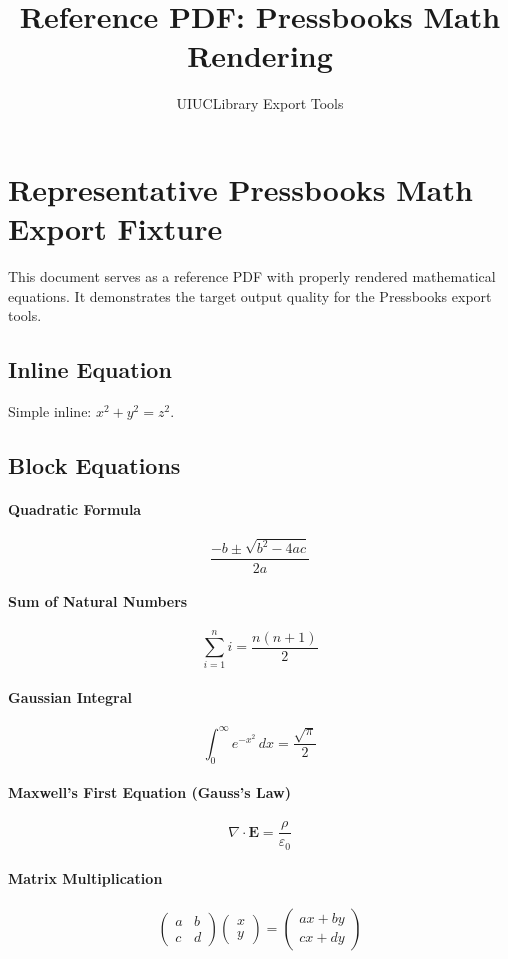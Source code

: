 \documentclass[12pt]{article}
\title{Reference PDF: Pressbooks Math Rendering}
\author{UIUCLibrary Export Tools}
\date{}
\begin{document}
\maketitle

\section{Representative Pressbooks Math Export Fixture}

This document serves as a reference PDF with properly rendered mathematical equations.
It demonstrates the target output quality for the Pressbooks export tools.

\subsection{Inline Equation}
Simple inline: $x^2 + y^2 = z^2$.

\subsection{Block Equations}

\paragraph{Quadratic Formula}
\[
\frac{-b \pm \sqrt{b^2 - 4ac}}{2a}
\]

\paragraph{Sum of Natural Numbers}
\[
\sum_{i=1}^{n} i = \frac{n(n+1)}{2}
\]

\paragraph{Gaussian Integral}
\[
\int_0^{\infty} e^{-x^2}\,dx = \frac{\sqrt{\pi}}{2}
\]

\paragraph{Maxwell's First Equation (Gauss's Law)}
\[
\nabla \cdot \mathbf{E} = \frac{\rho}{\varepsilon_0}
\]

\paragraph{Matrix Multiplication}
\[
\begin{pmatrix} a & b \\ c & d \end{pmatrix} \begin{pmatrix} x \\ y \end{pmatrix} = \begin{pmatrix} ax+by \\ cx+dy \end{pmatrix}
\]
\end{document}
